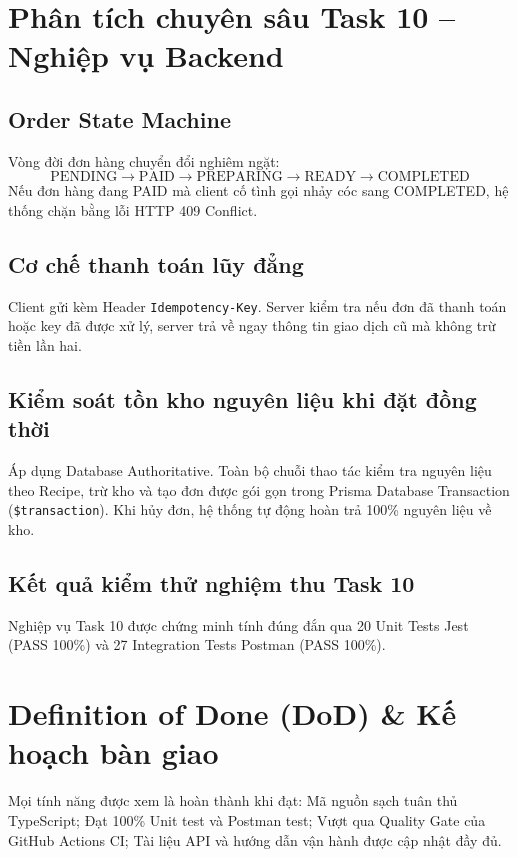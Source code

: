 \documentclass[a4paper]{article}
\begin{document}
\section{Phân tích chuyên sâu Task 10 – Nghiệp vụ Backend}
\subsection{Order State Machine}
Vòng đời đơn hàng chuyển đổi nghiêm ngặt:
$$\text{PENDING} \longrightarrow \text{PAID} \longrightarrow \text{PREPARING} \longrightarrow \text{READY} \longrightarrow \text{COMPLETED}$$
Nếu đơn hàng đang PAID mà client cố tình gọi nhảy cóc sang COMPLETED, hệ thống chặn bằng lỗi HTTP 409 Conflict.

\subsection{Cơ chế thanh toán lũy đẳng}
Client gửi kèm Header \texttt{Idempotency-Key}. Server kiểm tra nếu đơn đã thanh toán hoặc key đã được xử lý, server trả về ngay thông tin giao dịch cũ mà không trừ tiền lần hai.

\subsection{Kiểm soát tồn kho nguyên liệu khi đặt đồng thời}
Áp dụng Database Authoritative. Toàn bộ chuỗi thao tác kiểm tra nguyên liệu theo Recipe, trừ kho và tạo đơn được gói gọn trong Prisma Database Transaction (\texttt{\$transaction}). Khi hủy đơn, hệ thống tự động hoàn trả 100\% nguyên liệu về kho.

\subsection{Kết quả kiểm thử nghiệm thu Task 10}
Nghiệp vụ Task 10 được chứng minh tính đúng đắn qua 20 Unit Tests Jest (PASS 100\%) và 27 Integration Tests Postman (PASS 100\%).

\section{Definition of Done (DoD) \& Kế hoạch bàn giao}
Mọi tính năng được xem là hoàn thành khi đạt: Mã nguồn sạch tuân thủ TypeScript; Đạt 100\% Unit test và Postman test; Vượt qua Quality Gate của GitHub Actions CI; Tài liệu API và hướng dẫn vận hành được cập nhật đầy đủ.
\end{document}
